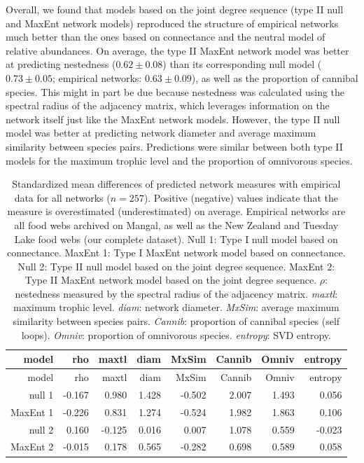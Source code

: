 \documentclass[10pt,oneside]{article}
\begin{document}
Overall, we found that models based on the joint degree sequence (type
II null and MaxEnt network models) reproduced the structure of empirical
networks much better than the ones based on connectance and the neutral
model of relative abundances. On average, the type II MaxEnt network
model was better at predicting nestedness (\(0.62 \pm 0.08\)) than its
corresponding null model (\(0.73 \pm 0.05\); empirical networks:
\(0.63 \pm 0.09\)), as well as the proportion of cannibal species. This
might in part be due because nestedness was calculated using the
spectral radius of the adjacency matrix, which leverages information on
the network itself just like the MaxEnt network models. However, the
type II null model was better at predicting network diameter and average
maximum similarity between species pairs. Predictions were similar
between both type II models for the maximum trophic level and the
proportion of omnivorous species.

\hypertarget{tbl:measures_all}{}
\begin{longtable}[]{@{}rrrrrrrr@{}}
\caption{\label{tbl:measures_all}Standardized mean differences of
predicted network measures with empirical data for all networks
(\(n = 257\)). Positive (negative) values indicate that the measure is
overestimated (underestimated) on average. Empirical networks are all
food webs archived on Mangal, as well as the New Zealand and Tuesday
Lake food webs (our complete dataset). Null 1: Type I null model based
on connectance. MaxEnt 1: Type I MaxEnt network model based on
connectance. Null 2: Type II null model based on the joint degree
sequence. MaxEnt 2: Type II MaxEnt network model based on the joint
degree sequence. \(\rho\): nestedness measured by the spectral radius of
the adjacency matrix. \emph{maxtl}: maximum trophic level. \emph{diam}:
network diameter. \emph{MxSim}: average maximum similarity between
species pairs. \emph{Cannib}: proportion of cannibal species (self
loops). \emph{Omniv}: proportion of omnivorous species. \emph{entropy}:
SVD entropy.}\tabularnewline
\toprule
model & rho & maxtl & diam & MxSim & Cannib & Omniv &
entropy\tabularnewline
\midrule
\endfirsthead
\toprule
model & rho & maxtl & diam & MxSim & Cannib & Omniv &
entropy\tabularnewline
\midrule
\endhead
null 1 & -0.167 & 0.980 & 1.428 & -0.502 & 2.007 & 1.493 &
0.056\tabularnewline
MaxEnt 1 & -0.226 & 0.831 & 1.274 & -0.524 & 1.982 & 1.863 &
0.106\tabularnewline
null 2 & 0.160 & -0.125 & 0.016 & 0.007 & 1.078 & 0.559 &
-0.023\tabularnewline
MaxEnt 2 & -0.015 & 0.178 & 0.565 & -0.282 & 0.698 & 0.589 &
0.058\tabularnewline
\bottomrule
\end{longtable}
\end{document}

